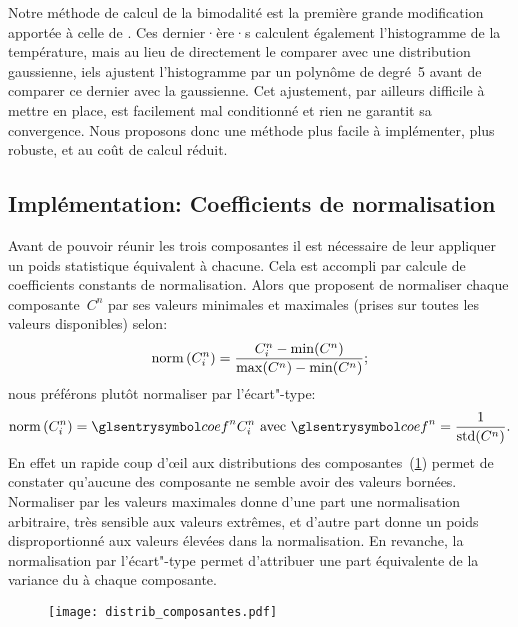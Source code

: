 Notre méthode de calcul de la bimodalité est la première grande modification apportée à celle de \textcite{liu_2016}.
Ces dernier·ère·s calculent également l'histogramme de la température, mais au lieu de directement le comparer avec une distribution gaussienne, iels ajustent l'histogramme par un polynôme de degré~5 avant de comparer ce dernier avec la gaussienne.
Cet ajustement, par ailleurs difficile à mettre en place, est facilement mal conditionné et rien ne garantit sa convergence.
Nous proposons donc une méthode plus facile à implémenter, plus robuste, et au coût de calcul réduit.

\subsection{Implémentation: Coefficients de normalisation}
\label{sec:coef-normalisation}

Avant de pouvoir réunir les trois composantes il est nécessaire de leur appliquer un poids statistique équivalent à chacune. Cela est accompli par calcule de coefficients constants de normalisation.
Alors que \citeauthor{liu_2016} proposent de normaliser chaque composante~\(C^n\) par ses valeurs minimales et maximales (prises sur toutes les valeurs disponibles) selon:
\begin{equation}
  \operatorname{norm}\left(C_i^n\right) = \frac {C_i^n - \min(C^n)} {\max(C^n) - \min(C^n)} ;
\end{equation}
nous préférons plutôt normaliser par l'écart"-type:
\begin{equation}
  \norm{C_i^n} = \am{coef}^n C_i^n
  \text{ avec } \am{coef}^n = \frac {1} {\std(C^n)} .
\end{equation}
En effet un rapide coup d’œil aux distributions des composantes~(\cref{fig:distrib-composantes}) permet de constater qu'aucune des composante ne semble avoir des valeurs bornées.
Normaliser par les valeurs maximales donne d'une part une normalisation arbitraire, très sensible aux valeurs extrêmes, et d'autre part donne un poids disproportionné aux valeurs élevées dans la normalisation.
En revanche, la normalisation par l'écart"-type permet d'attribuer une part équivalente de la variance du  à chaque composante.

\begin{figure}
  \centering
  \texttt{[image: distrib\_composantes.pdf]}
  \label{fig:distrib-composantes}
\end{figure}

